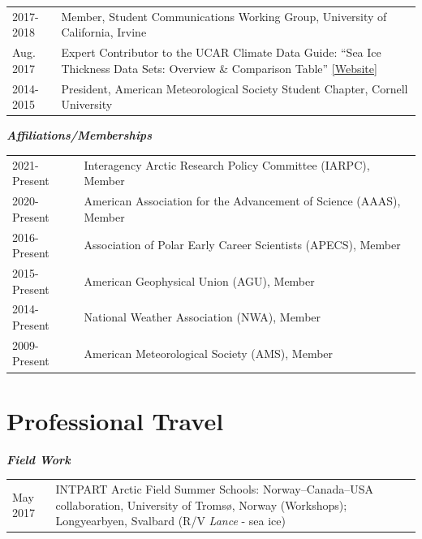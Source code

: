 \documentclass[margin,line,palatino,courier,10pt]{res}
\begin{document}
\begin{resume}
\begin{tabular}{@{}p{0.9in}p{4in}}
2017-2018 & Member, Student Communications Working Group, University of California, Irvine\\
Aug. 2017 & Expert Contributor to the UCAR Climate Data Guide: ``Sea Ice Thickness Data Sets: Overview \& Comparison Table'' \href{https://climatedataguide.ucar.edu/climate-data/sea-ice-thickness-data-sets-overview-comparison-table}{[Website]}\\
2014-2015 & President, American Meteorological Society Student Chapter, Cornell University\\
\end{tabular}

\textit{\textbf{Affiliations/Memberships}}
\vspace*{0.05in}\\
\begin{tabular}{@{}p{0.9in}p{4in}}
2021-Present & Interagency Arctic Research Policy Committee (IARPC), Member\\
2020-Present & American Association for the Advancement of Science (AAAS), Member\\
2016-Present & Association of Polar Early Career Scientists (APECS), Member\\ 
2015-Present & American Geophysical Union (AGU), Member\\
2014-Present & National Weather Association (NWA), Member\\
2009-Present & American Meteorological Society (AMS), Member\\
\end{tabular}
\section{\sc \textcolor{Cerulean}{\large{\textbf{Professional Travel}}}}
\textit{\textbf{Field Work}}
\vspace*{0.05in}\\
\begin{tabular}{@{}p{0.9in}p{4in}}
May 2017 & INTPART Arctic Field Summer Schools: Norway--Canada--USA collaboration, University of Troms\o, Norway (Workshops); Longyearbyen, Svalbard (R/V \textit{Lance} - sea ice)
\end{tabular}


\end{resume}
\end{document}
